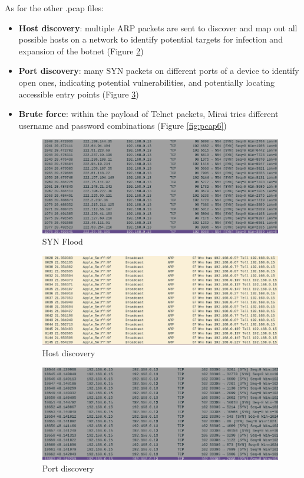 As for the other .pcap files:
\begin{itemize}
    \item \textbf{Host discovery}: multiple ARP packets are sent to discover and map out all possible hosts on a network to identify potential targets for infection and expansion of the botnet (Figure \ref{fig:pcap21})
    \item \textbf{Port discovery}: many SYN packets on different ports of a device to identify open ones, indicating potential vulnerabilities, and potentially locating accessible entry points (Figure \ref{fig:pcap22})
    \item \textbf{Brute force}: within the payload of Telnet packets, Mirai tries different username and password combinations (Figure \ref{fig:pcap6})

\begin{figure}
	\centering
	\includegraphics[width=1.0\textwidth]{resources/images/pcap1.png}
	\caption{SYN Flood}
	\label{fig:pcap1}
\end{figure}

\begin{figure}
	\centering
	\includegraphics[width=1.0\textwidth]{resources/images/pcap21.png}
	\caption{Host discovery}
	\label{fig:pcap21}
\end{figure}

\begin{figure}
	\centering
	\includegraphics[width=1.0\textwidth]{resources/images/pcap22.png}
	\caption{Port discovery}
	\label{fig:pcap22}
\end{figure}


\end{itemize}
